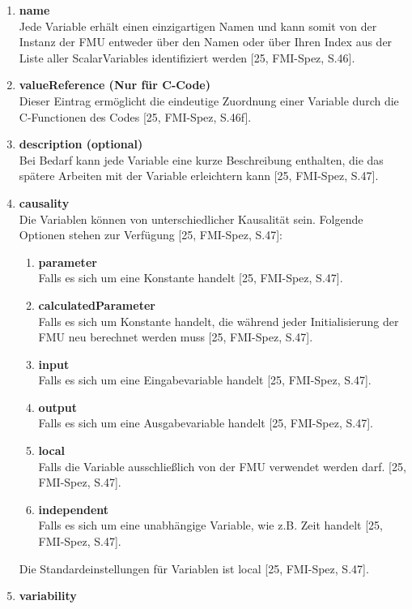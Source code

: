 \begin{enumerate}
	\item \textbf{name} \\
	Jede Variable erhält einen einzigartigen Namen und kann somit von der Instanz der FMU
	entweder über den Namen oder über Ihren Index aus der Liste aller ScalarVariables
	identifiziert werden [25, FMI-Spez, S.46].
	\item \textbf{valueReference (Nur für C-Code)} \\
	Dieser Eintrag ermöglicht die eindeutige Zuordnung einer Variable durch die C-Functionen
	des Codes [25, FMI-Spez, S.46f].
	\item \textbf{description (optional)} \\
	Bei Bedarf kann jede Variable eine kurze Beschreibung enthalten, die das spätere Arbeiten
	mit der Variable erleichtern kann [25, FMI-Spez, S.47].
	\item \textbf{causality} \\
	Die Variablen können von unterschiedlicher Kausalität sein. Folgende Optionen stehen zur
	Verfügung [25, FMI-Spez, S.47]:
	\begin{enumerate}
		\item \textbf{parameter} \\
		Falls es sich um eine Konstante handelt [25, FMI-Spez, S.47].
		\item \textbf{calculatedParameter} \\
		Falls es sich um Konstante handelt, die während jeder 
		Initialisierung der FMU neu berechnet werden muss [25, FMI-Spez, S.47].
		\item \textbf{input} \\
		Falls es sich um eine Eingabevariable handelt [25, FMI-Spez, S.47].
		\item \textbf{output} \\
		Falls es sich um eine Ausgabevariable handelt [25, FMI-Spez, S.47].
		\item \textbf{local} \\
		Falls die Variable ausschließlich von der FMU verwendet werden darf.
		[25, FMI-Spez, S.47].
		\item \textbf{independent} \\
		Falls es sich um eine unabhängige Variable, wie z.B. Zeit handelt
		[25, FMI-Spez, S.47].
	\end{enumerate}
	Die Standardeinstellungen für Variablen ist local [25, FMI-Spez, S.47].
	\item \textbf{variability} \\

\end{enumerate}
